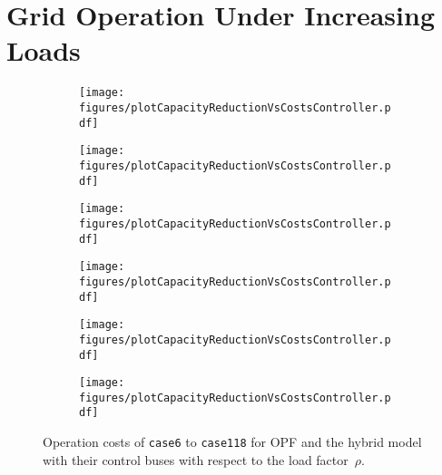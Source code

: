 \documentclass{article}[11pt,a4paper]
\begin{document}
\section{Grid Operation Under Increasing Loads}
\label{app:grid-control-when-approaching-capacity-limits}
\begin{figure}[H]
\vspace{-0.4cm}
  \begin{subfigure}[t]{.45\textwidth}
  	\centering
    	\texttt{[image: figures/plotCapacityReductionVsCostsController.pdf]}
\label{fig:plot-capacity-cost-controller-case6}
\end{subfigure}
\hfill
\begin{subfigure}[t]{.45\textwidth}
  	\centering
    	\texttt{[image: figures/plotCapacityReductionVsCostsController.pdf]}
\label{fig:plot-capacity-cost-controller-case9}
\end{subfigure}

\vspace{0.5cm}
\begin{subfigure}[t]{.45\textwidth}
  	\centering
    	\texttt{[image: figures/plotCapacityReductionVsCostsController.pdf]}
\label{fig:plot-capacity-cost-controller-case14}
\end{subfigure}
\hfill
\begin{subfigure}[t]{.45\textwidth}
  	\centering
    	\texttt{[image: figures/plotCapacityReductionVsCostsController.pdf]}
\label{fig:plot-capacity-cost-controller-case30}
\end{subfigure}

\vspace{0.5cm}
\begin{subfigure}[t]{.45\textwidth}
  	\centering
    	\texttt{[image: figures/plotCapacityReductionVsCostsController.pdf]}
\label{fig:plot-capacity-cost-controller-case39}
\end{subfigure}
\hfill
\begin{subfigure}[t]{.45\textwidth}
  	\centering
    	\texttt{[image: figures/plotCapacityReductionVsCostsController.pdf]}
	\label{fig:plot-capacity-cost-controller-case118}
\end{subfigure}
\vspace{0cm}
	\caption{Operation costs of \texttt{case6} to \texttt{case118} for OPF and the
          hybrid model with their control buses with respect to
          the load factor~$\rho$.}
\end{figure}
\end{document}
